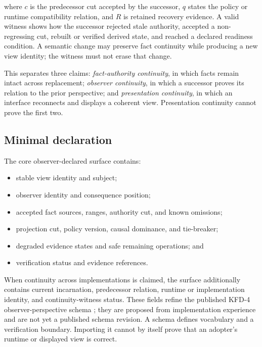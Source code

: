 where $c$ is the predecessor cut accepted by the successor, $q$ states the
policy or runtime compatibility relation, and $R$ is retained recovery
evidence. A valid witness shows how the successor rejected stale authority,
accepted a non-regressing cut, rebuilt or verified derived state, and reached a
declared readiness condition. A semantic change may preserve fact continuity
while producing a new view identity; the witness must not erase that change.

This separates three claims: \emph{fact-authority continuity}, in which facts
remain intact across replacement; \emph{observer continuity}, in which a
successor proves its relation to the prior perspective; and
\emph{presentation continuity}, in which an interface reconnects and displays
a coherent view. Presentation continuity cannot prove the first two.

\subsection{Minimal declaration}

The core observer-declared surface contains:

\begin{itemize}[leftmargin=*]
  \item stable view identity and subject;
  \item observer identity and consequence position;
  \item accepted fact sources, ranges, authority cut, and known omissions;
  \item projection cut, policy version, causal dominance, and tie-breaker;
  \item degraded evidence states and safe remaining operations; and
  \item verification status and evidence references.
\end{itemize}

When continuity across implementations is claimed, the surface additionally
contains current incarnation, predecessor relation, runtime or implementation
identity, and continuity-witness status. These fields refine the published
KFD-4 observer-perspective schema \cite{kfd2026observer}; they are proposed from
implementation experience and are not yet a published schema revision. A
schema defines vocabulary and a verification boundary. Importing it cannot by
itself prove that an adopter's runtime or displayed view is correct.
